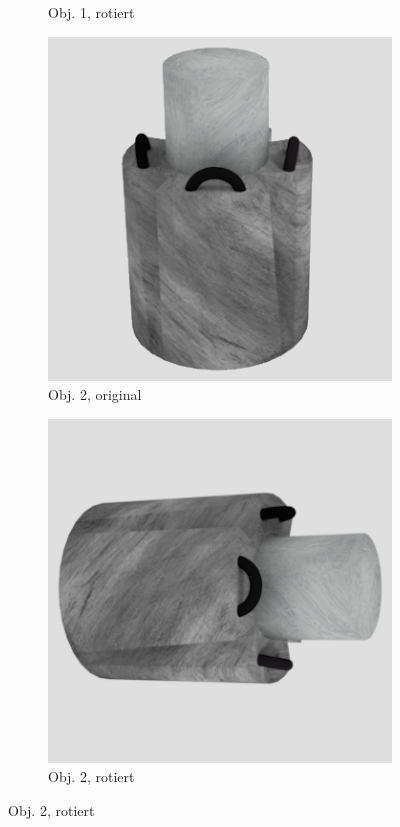 \begin{figure}
\begin{subfigure}{0.2\textwidth}
\caption{Obj. 1, rotiert} \label{fig:d}
\end{subfigure} \hspace{.5cm}%
\begin{subfigure}{0.2\textwidth}
\includegraphics[width=\linewidth]{Bilder/Objekt2A.png}
\caption{Obj. 2, original} \label{fig:e}
\end{subfigure}\hspace{.5cm}
\begin{subfigure}{0.2\textwidth}
\includegraphics[width=\linewidth]{Bilder/Objekt2B.png}
\caption{Obj. 2, rotiert} \label{fig:f}
\end{subfigure}\hspace{.5cm}


\end{figure}
